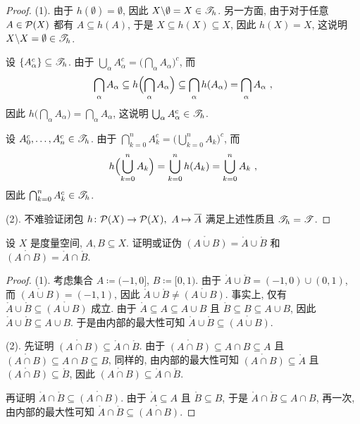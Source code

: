 \begin{proof}
    (1). 由于 \(h(\emptyset) = \emptyset\), 因此 \(X \backslash \emptyset = X \in \mathscr T_h\). 另一方面, 由于对于任意 \(A \in \mathcal P(X)\) 都有 \(A \subseteq h(A)\), 于是 \(X \subseteq h(X) \subseteq X\), 因此 \(h(X) = X\), 这说明 \(X \backslash X = \emptyset \in \mathscr T_h\).

    设 \(\{A_\alpha^c\} \subseteq \mathscr T_h\). 由于 \(\bigcup_\alpha A_\alpha^c = \bigl(\bigcap_\alpha A_\alpha\bigr)^c\), 而
    \[
        \bigcap_\alpha A_\alpha \subseteq h\Bigl(\bigcap_\alpha A_\alpha\Bigr) \subseteq \bigcap_\alpha h(A_\alpha) = \bigcap_\alpha A_\alpha\ ,
    \]
    因此 \(h\bigl(\bigcap_\alpha A_\alpha\bigr) = \bigcap_\alpha A_\alpha\), 这说明 \(\bigcup_\alpha A_\alpha^c \in \mathscr T_h\).

    设 \(A_0^c, \ldots, A_n^c \in \mathscr T_h\). 由于 \(\bigcap_{k = 0}^n A_k^c = \bigl(\bigcup_{k = 0}^n A_k\bigr)^c\), 而
    \[
        h\Bigl(\bigcup_{k = 0}^n A_k\Bigr) = \bigcup_{k = 0}^n h(A_k) = \bigcup_{k = 0}^n A_k\ ,
    \]
    因此 \(\bigcap_{k = 0}^n A_k^c \in \mathscr T_h\).

    (2). 不难验证闭包 \(h \colon \mathcal P(X) \to \mathcal P(X),\ A \mapsto \overline A\) 满足上述性质且 \(\mathscr T_h = \mathscr T\).
\end{proof}

\begin{exercise}
    设 \(X\) 是度量空间, \(A, B \subseteq X\). 证明或证伪 \(\mathring{(A \cup B)} = \mathring A \cup \mathring B\) 和 \(\mathring{(A \cap B)} = \mathring A \cap \mathring B\).
\end{exercise}

\begin{proof}
    (1). 考虑集合 \(A \coloneqq (- 1, 0]\), \(B \coloneqq [0, 1)\). 由于 \(\mathring A \cup \mathring B = (- 1, 0) \cup (0, 1)\), 而 \(\mathring{(A \cup B)} = (- 1, 1)\), 因此 \(\mathring A \cup \mathring B \neq \mathring{(A \cup B)}\). 事实上, 仅有 \(\mathring A \cup \mathring B \subseteq \mathring{(A \cup B)}\) 成立. 由于 \(\mathring A \subseteq A \subseteq A \cup B\) 且 \(\mathring B \subseteq B \subseteq A \cup B\), 因此 \(\mathring A \cup \mathring B \subseteq A \cup B\). 于是由内部的最大性可知 \(\mathring A \cup \mathring B \subseteq \mathring{(A \cup B)}\).

    (2). 先证明 \(\mathring{(A \cap B)} \subseteq \mathring A \cap \mathring B\). 由于 \(\mathring{(A \cap B)} \subseteq A \cap B \subseteq A\) 且 \(\mathring{(A \cap B)} \subseteq A \cap B \subseteq B\), 同样的, 由内部的最大性可知 \(\mathring{(A \cap B)} \subseteq \mathring A\) 且 \(\mathring{(A \cap B)} \subseteq \mathring B\), 因此 \(\mathring{(A \cap B)} \subseteq \mathring A \cap \mathring B\).

    再证明 \(\mathring A \cap \mathring B \subseteq \mathring{(A \cap B)}\). 由于 \(\mathring A \subseteq A\) 且 \(\mathring B \subseteq B\), 于是 \(\mathring A \cap \mathring B \subseteq A \cap B\), 再一次, 由内部的最大性可知 \(\mathring A \cap \mathring B \subseteq \mathring{(A \cap B)}\).
\end{proof}

